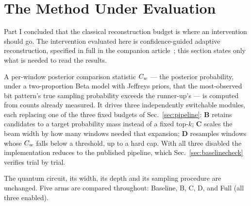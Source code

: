 \section{The Method Under Evaluation}
\label{sec:method}

Part I concluded that the classical reconstruction budget is where an
intervention should go. The intervention evaluated here is
confidence-guided adaptive reconstruction, specified in full in the
companion article~\cite{methodpaper}; this section states only what is
needed to read the results.

A per-window posterior comparison statistic $C_w$ --- the posterior
probability, under a two-proportion Beta model with Jeffreys priors, that
the most-observed bit pattern's true sampling probability exceeds the
runner-up's --- is computed from counts already measured. It drives three
independently switchable modules, each replacing one of the three fixed
budgets of Sec.~\ref{sec:pipeline}: \textbf{B} retains candidates to a
target probability mass instead of a fixed top-$k$; \textbf{C} scales the
beam width by how many windows needed that expansion; \textbf{D} resamples
windows whose $C_w$ falls below a threshold, up to a hard cap. With all
three disabled the implementation reduces to the published pipeline, which
Sec.~\ref{sec:baselinecheck} verifies trial by trial.

The quantum circuit, its width, its depth and its sampling procedure are
unchanged. Five arms are compared throughout: Baseline, B, C, D, and Full
(all three enabled).


